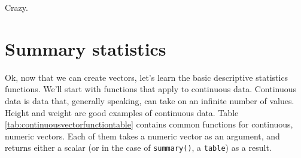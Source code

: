 \documentclass[]{book}
\theoremstyle{definition}
\theoremstyle{definition}
\theoremstyle{remark}
\begin{document}
Crazy.

\section{Summary statistics}\label{summary-statistics}

Ok, now that we can create vectors, let's learn the basic descriptive
statistics functions. We'll start with functions that apply to
continuous data. Continuous data is data that, generally speaking, can
take on an infinite number of values. Height and weight are good
examples of continuous data. Table
\ref{tab:continuousvectorfunctiontable} contains common functions for
continuous, numeric vectors. Each of them takes a numeric vector as an
argument, and returns either a scalar (or in the case of
\texttt{summary()}, a \texttt{table}) as a result.
\end{document}
